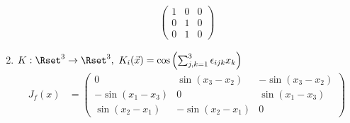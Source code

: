 \documentclass[11pt,answers]{exam}
\begin{document}
\begin{questions}
\begin{solution}
\begin{enumerate}
\begin{align*}
\begin{pmatrix}
1 & 0 & 0\\
0 & 1 & 0\\
0 & 1 & 0
\end{pmatrix}
\end{align*}
\item $K:\Rset^3\to\Rset^3,~K_i(\vec{x})=\cos\left(\sum_{j,k=1}^3\epsilon_{ijk}x_k\right)$
\begin{align*}
J_f(x)&=\begin{pmatrix}
0 & \sin(x_3-x_2) & -\sin(x_3-x_2)\\
-\sin(x_1-x_3) & 0 & \sin(x_1-x_3)\\
\sin(x_2-x_1) & -\sin(x_2-x_1) & 0
\end{pmatrix}
\end{align*}

\end{enumerate}
\end{solution}



%



\end{questions}
\end{document}
